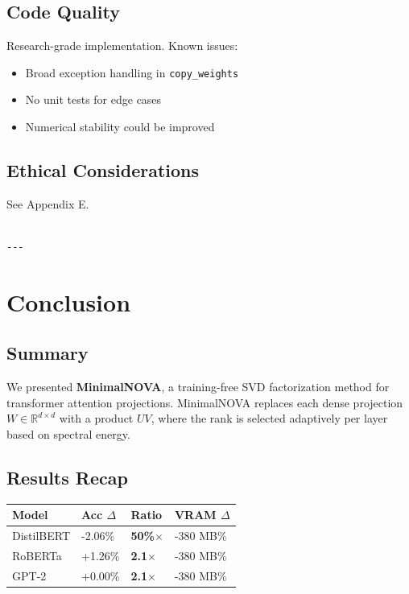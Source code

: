 \subsection{Code Quality}

Research-grade implementation. Known issues:
\begin{itemize}
\item Broad exception handling in \texttt{copy\_weights}
\item No unit tests for edge cases
\item Numerical stability could be improved

\end{itemize}
\subsection{Ethical Considerations}

See Appendix E.
\begin{lstlisting}

---
\end{lstlisting}


\section{Conclusion}

\subsection{Summary}

We presented \textbf{MinimalNOVA}, a training-free SVD factorization method for 
transformer attention projections. MinimalNOVA replaces each dense projection 
$W \in \mathbb{R}^{d \times d}$ with a product $U V$, where the rank is 
selected adaptively per layer based on spectral energy.

\subsection{Results Recap}

\begin{table}[H]
\centering
\small
\begin{tabular}{llll}
\toprule
\textbf{Model} & \textbf{Acc $\Delta$} & \textbf{Ratio} & \textbf{VRAM $\Delta$} \\
\midrule
DistilBERT & -2.06\% & \textbf{50\%$\times$} & -380 MB\% \\
RoBERTa & +1.26\% & \textbf{2.1$\times$} & -380 MB\% \\
GPT-2 & +0.00\% & \textbf{2.1$\times$} & -380 MB\% \\
\bottomrule
\end{tabular}
\end{table}

